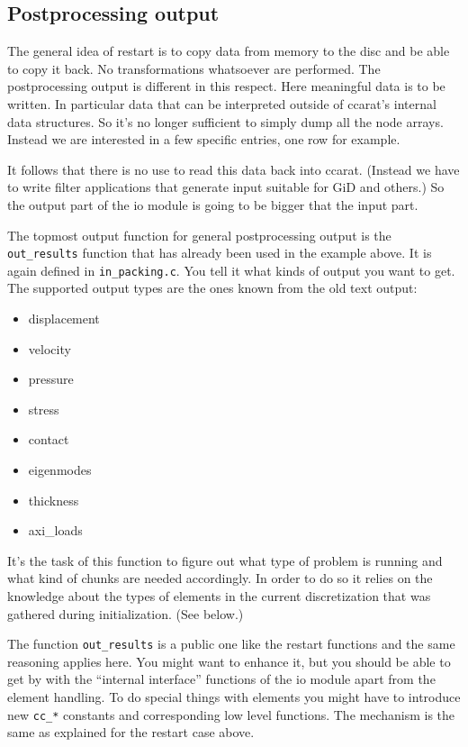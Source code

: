 \subsection{Postprocessing output}

The general idea of restart is to copy data from memory to the disc
and be able to copy it back. No transformations whatsoever are performed.
The postprocessing output is different in this respect. Here meaningful
data is to be written. In particular data that can be interpreted
outside of ccarat's internal data structures. So it's no longer sufficient
to simply dump all the node arrays. Instead we are interested in a
few specific entries, one row for example.

It follows that there is no use to read this data back into ccarat.
(Instead we have to write filter applications that generate input
suitable for GiD and others.) So the output part of the io module
is going to be bigger that the input part.

The topmost output function for general postprocessing output is the
\texttt{out{\_}results} function that has already been used in the
example above. It is again defined in \texttt{in{\_}packing.c}.
You tell it what kinds of output you want to get. The supported output
types are the ones known from the old text output: 

\begin{itemize}
\item {} displacement
\item {} velocity
\item {} pressure
\item {} stress
\item {} contact
\item {} eigenmodes
\item {} thickness
\item {} axi{\_}loads
\end{itemize}
It's the task of this function to figure out what type of problem
is running and what kind of chunks are needed accordingly. In order
to do so it relies on the knowledge about the types of elements in
the current discretization that was gathered during initialization.
(See below.)

The function \texttt{out{\_}results} is a public one like the restart
functions and the same reasoning applies here. You might want to enhance
it, but you should be able to get by with the {}``internal interface''
functions of the io module apart from the element handling. To do
special things with elements you might have to introduce new \texttt{cc{\_}{*}}
constants and corresponding low level functions. The mechanism is
the same as explained for the restart case above.


